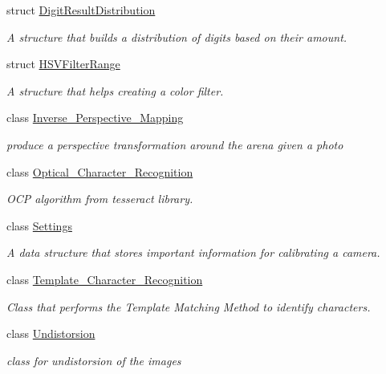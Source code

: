 \begin{DoxyCompactItemize}
struct \mbox{\hyperlink{struct_image_processing_1_1_digit_result_distribution}{Digit\+Result\+Distribution}}
\begin{DoxyCompactList}\small\item\em A structure that builds a distribution of digits based on their amount. \end{DoxyCompactList}\item 
struct \mbox{\hyperlink{struct_image_processing_1_1_h_s_v_filter_range}{H\+S\+V\+Filter\+Range}}
\begin{DoxyCompactList}\small\item\em A structure that helps creating a color filter. \end{DoxyCompactList}\item 
class \mbox{\hyperlink{class_image_processing_1_1_inverse___perspective___mapping}{Inverse\+\_\+\+Perspective\+\_\+\+Mapping}}
\begin{DoxyCompactList}\small\item\em produce a perspective transformation around the arena given a photo \end{DoxyCompactList}\item 
class \mbox{\hyperlink{class_image_processing_1_1_optical___character___recognition}{Optical\+\_\+\+Character\+\_\+\+Recognition}}
\begin{DoxyCompactList}\small\item\em O\+CP algorithm from tesseract library. \end{DoxyCompactList}\item 
class \mbox{\hyperlink{class_image_processing_1_1_settings}{Settings}}
\begin{DoxyCompactList}\small\item\em A data structure that stores important information for calibrating a camera. \end{DoxyCompactList}\item 
class \mbox{\hyperlink{class_image_processing_1_1_template___character___recognition}{Template\+\_\+\+Character\+\_\+\+Recognition}}
\begin{DoxyCompactList}\small\item\em Class that performs the Template Matching Method to identify characters. \end{DoxyCompactList}\item 
class \mbox{\hyperlink{class_image_processing_1_1_undistorsion}{Undistorsion}}
\begin{DoxyCompactList}\small\item\em class for undistorsion of the images \end{DoxyCompactList}\end{DoxyCompactItemize}
